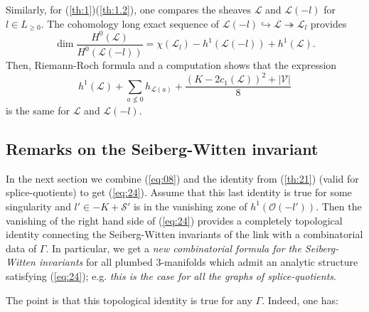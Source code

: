 \documentclass[10pt,a4paper]{amsart}
\numberwithin{equation}{section}
\numberwithin{equation}{subsection}
\theoremstyle{plain}
\theoremstyle{definition}
\begin{document}
Similarly, for (\ref{th:1})(\ref{th:1.2}), one compares the
sheaves ${\mathcal{L}}$ and ${\mathcal{L}}(-l)$ for $l\in L_{\geq 0}$.
The cohomology long exact sequence of
${\mathcal{L}}(-l)\hookrightarrow {\mathcal{L}} \twoheadrightarrow
{\mathcal{L}}_l$ provides
\begin{equation*}
\dim \frac{H^0({\mathcal{L}})}{H^0({\mathcal{L}}(-l))}=
\chi({\mathcal{L}}_l)-h^1({\mathcal{L}}(-l))+h^1({\mathcal{L}}).
\end{equation*}
Then, Riemann-Roch formula and a computation shows that the
expression
\begin{equation*}
h^1({\mathcal{L}})+\sum_{a\nleq
0}h_{{\mathcal{L}}(a)}+\frac{(K-2c_1({\mathcal{L}}))^2+|{\mathcal{V}}|}{8}
\end{equation*}
is the same for ${\mathcal{L}}$ and ${\mathcal{L}}(-l)$.

\subsection{Remarks on the Seiberg-Witten invariant}\label{re:SW}
In the next section we combine (\ref{eq:08}) and the identity from 
(\ref{th:21}) (valid for splice-quotients) to get (\ref{eq:24}).
Assume that this last identity  is true for some singularity and $l'\in
-K+{\mathcal{S}}'$ is in the vanishing zone of $h^1({\mathcal{O}}(-l'))$. Then the
vanishing of the right hand side of (\ref{eq:24}) provides a
completely topological identity connecting the Seiberg-Witten
invariants of the link with a combinatorial data of $\Gamma$. In
particular, we get a {\em new combinatorial formula for the
Seiberg-Witten invariants} for all plumbed 3-manifolds which admit
an analytic structure satisfying 
(\ref{eq:24}); e.g. {\em this is the case for all the graphs of
splice-quotients}.

The point is that this topological identity is true for any
$\Gamma$. Indeed, one has:
\end{document}
